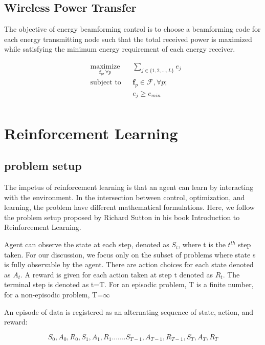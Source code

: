 \documentclass[journal]{IEEEtran}
\begin{document}
\subsection{Wireless Power Transfer}

The objective of energy beamforming control is to choose a beamforming code for each energy transmitting node such that the total received power is maximized while satisfying the minimum energy requirement of each energy receiver.

\begin{equation*}
    \begin{aligned}
        & \underset{ \textbf{f}_p, \forall p}{\text{maximize}}
        && \displaystyle\sum_{j \in \{1,2,...,L\}} e_j\\
        & \text{subject to}
        && \textbf{f}_p \in \mathcal{F}, \forall p;\\
        &&& e_j \geq e_{min}\\
    \end{aligned}
\end{equation*}


\section{Reinforcement Learning}


\subsection{problem setup}
The impetus of reinforcement learning is that an agent can learn by interacting with the environment. In the intersection between control, optimization, and learning, the problem have different mathematical formulations. Here, we follow the problem setup proposed by Richard Sutton in his book Introduction to Reinforcement Learning. \cite{10.5555/551283}

Agent can observe the state at each step, denoted as $ S_{t} $, where t is the $t^{th}$ step taken. For our discussion, we focus only on the subset of problems where state s is fully observable by the agent. There are action choices for each state denoted as $ A_{t} $. A reward is given for each action taken at step t denoted as $ R_{t} $. The terminal step is denoted as t=T. For an episodic problem, T is a finite number, for a non-episodic problem, T=$\infty$

An episode of data is registered as an alternating sequence of state, action, and reward:

$$ S_{0}, A_{0}, R_{0}, S_{1}, A_{1}, R_{1}.......S_{T-1},A_{T-1},R_{T-1},S_{T},A_{T},R_{T} $$
\end{document}
